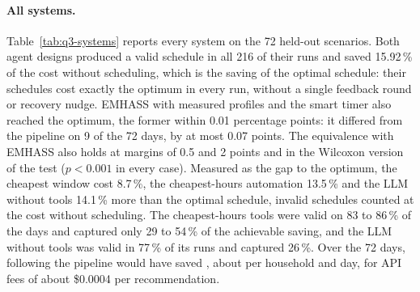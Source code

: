\documentclass[12pt,a4paper]{report}
\begin{document}
\paragraph{All systems.} Table~\ref{tab:q3-systems} reports every system
on the 72 held-out scenarios. Both agent designs produced a valid
schedule in all 216 of their runs and saved 15.92\,\% of the cost
without scheduling, which is the saving of the optimal schedule: their
schedules cost exactly the optimum in every run, without a single
feedback round or recovery nudge. EMHASS with measured profiles and the
smart timer also reached the optimum, the former within 0.01 percentage
points: it differed from the pipeline on 9 of the 72 days, by at most
0.07 points. The equivalence with EMHASS also holds at margins of 0.5
and 2 points and in the Wilcoxon version of the test ($p < 0.001$ in
every case). Measured as the gap to the optimum, the cheapest window
cost 8.7\,\%, the cheapest-hours automation 13.5\,\% and the LLM without
tools 14.1\,\% more than the optimal schedule, invalid schedules counted
at the cost without scheduling. The cheapest-hours tools were valid on 83 to 86\,\% of the days
and captured only 29 to 54\,\% of the achievable saving, and the LLM
without tools was valid in 77\,\% of its runs and captured 26\,\%.
Over the 72 days, following the pipeline would have saved
, about  per household and day, for API fees of
about \$0.0004 per recommendation.
\end{document}
